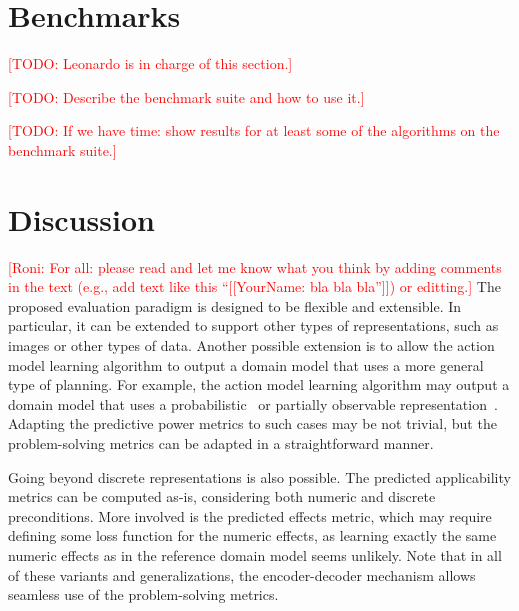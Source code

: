 \documentclass{article}
\theoremstyle{definition}
\theoremstyle{remark}
\newcommand{\todo}[1]{{\textcolor{red}{[TODO: #1]}}}
\newcommand{\roni}[1]{{\textcolor{red}{[Roni: #1]}}}
\begin{document}


\section{Benchmarks}

\todo{Leonardo is in charge of this section.}

\todo{Describe the benchmark suite and how to use it.}

\todo{If we have time: show results for at least some of the algorithms on the benchmark suite.}

\section{Discussion}
\roni{For all: please read and let me know what you think by adding comments in the text (e.g., add text like this ``[[YourName: bla bla bla'']]) or editting.}
The proposed evaluation paradigm is designed to be flexible and extensible. 
In particular, it can be extended to support other types of representations, such as images or other types of data. 
Another possible extension is to allow the action model learning algorithm to output a domain model that uses a more general type of planning. 
For example, the action model learning algorithm may output a domain model that uses a probabilistic~\citep{xi2024neuro} or partially observable representation~\citep{le2024learning}. 
Adapting the predictive power metrics to such cases may be not trivial, but the problem-solving metrics can be adapted in a straightforward manner.


Going beyond discrete representations is also possible. 
The predicted applicability metrics can be computed as-is, considering both numeric and discrete preconditions.
More involved is the predicted effects metric, which may require defining some loss function for the numeric effects, as learning exactly the same numeric effects as in the reference domain model seems unlikely. 
Note that in all of these variants and generalizations, the encoder-decoder mechanism allows seamless use of the problem-solving metrics. 
\end{document}
